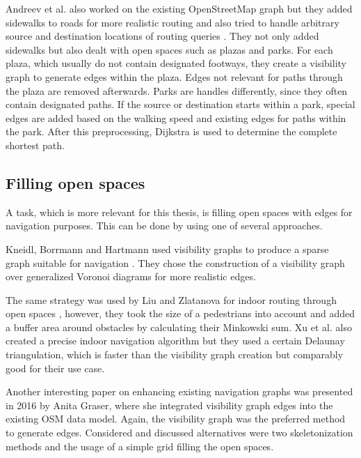 		Andreev et al. also worked on the existing OpenStreetMap graph but they added sidewalks to roads for more realistic routing and also tried to handle arbitrary source and destination locations of routing queries \cite{andreev-osm-generate-sidewalks}.
		They not only added sidewalks but also dealt with open spaces such as plazas and parks.
		For each plaza, which usually do not contain designated footways, they create a visibility graph to generate edges within the plaza.
		Edges not relevant for paths through the plaza are removed afterwards.
		Parks are handles differently, since they often contain designated paths.
		If the source or destination starts within a park, special edges are added based on the walking speed and existing edges for paths within the park.
		After this preprocessing, Dijkstra is used to determine the complete shortest path.
	
	\subsection{Filling open spaces}
	\label{subsec:filling-open-spaces}
	
		A task, which is more relevant for this thesis, is filling open spaces with edges for navigation purposes.
		This can be done by using one of several approaches.
	
		Kneidl, Borrmann and Hartmann used visibility graphs to produce a sparse graph suitable for navigation \cite{kneidl-borrmann-hartmann-navigation}.
		They chose the construction of a visibility graph over generalized Voronoi diagrams for more realistic edges.
		
		The same strategy was used by Liu and Zlatanova for indoor routing through open spaces \cite{liu-indoor-routing}, however, they took the size of a pedestrians into account and added a buffer area around obstacles by calculating their Minkowski sum.
		Xu et al. also created a precise indoor navigation algorithm but they used a certain Delaunay triangulation, which is faster than the visibility graph creation but comparably good \cite{xu-indoor-delaunay} for their use case.
		
		Another interesting paper on enhancing existing navigation graphs was presented in 2016 by Anita Graser, where she integrated visibility graph edges into the existing OSM data model\cite{graser-osm-open-spaces}.
		Again, the visibility graph was the preferred method to generate edges.
		Considered and discussed alternatives were two skeletonization methods and the usage of a simple grid filling the open spaces.
		
